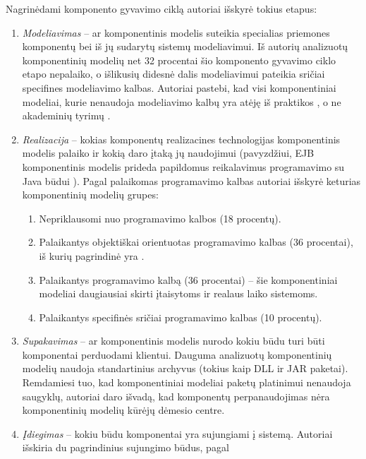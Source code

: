 Nagrinėdami komponento gyvavimo ciklą autoriai išskyrė tokius
etapus:
\begin{enumerate}
  \item \emph{Modeliavimas} – ar komponentinis modelis suteikia
    specialias priemones komponentų bei iš jų sudarytų sistemų
    modeliavimui. Iš autorių analizuotų komponentinių modelių net
    32 procentai šio komponento gyvavimo ciklo etapo nepalaiko,
    o išlikusių didesnė dalis modeliavimui pateikia sričiai
    specifines  modeliavimo kalbas. Autoriai
    pastebi, kad visi komponentiniai modeliai, kurie nenaudoja
    modeliavimo kalbų yra atėję iš praktikos , o ne akademinių tyrimų 
    \cite[604]{classification-framework-for-scm}.
  \item \emph{Realizacija} – kokias komponentų realizacines technologijas
    komponentinis modelis palaiko ir kokią daro įtaką jų naudojimui
    (pavyzdžiui, EJB komponentinis modelis prideda papildomus reikalavimus
    programavimo su Java būdui
    \cite[597]{classification-framework-for-scm}). Pagal palaikomas
    programavimo kalbas autoriai išskyrė keturias komponentinių
    modelių grupes:
    \begin{enumerate}
      \item Nepriklausomi nuo programavimo kalbos (18 procentų).
      \item Palaikantys objektiškai orientuotas programavimo kalbas
        (36 procentai), iš kurių pagrindinė yra .
      \item Palaikantys  programavimo kalbą (36 procentai)
        – šie komponentiniai modeliai daugiausiai skirti įtaisytoms
         ir realaus laiko sistemoms.
      \item Palaikantys specifinės sričiai 
        programavimo kalbas (10 procentų).
    \end{enumerate}
  \item \emph{Supakavimas} – ar komponentinis modelis nurodo kokiu
    būdu turi būti komponentai perduodami klientui. Dauguma
    analizuotų komponentinių modelių naudoja standartinius archyvus
    (tokius kaip DLL ir JAR paketai). Remdamiesi tuo, kad komponentiniai
    modeliai paketų platinimui nenaudoja saugyklų, autoriai daro
    išvadą, kad komponentų perpanaudojimas nėra komponentinių
    modelių kūrėjų dėmesio centre.
  \item \emph{Įdiegimas} – kokiu būdu komponentai yra sujungiami į sistemą.
    Autoriai išskiria du pagrindinius sujungimo būdus, pagal

\end{enumerate}
